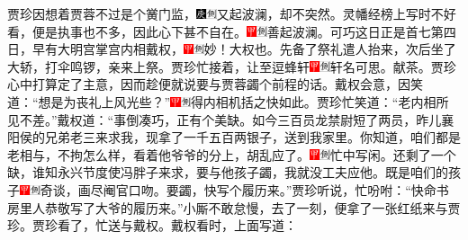 贾珍因想着贾蓉不过是个黉门监，{\includegraphics[width=3mm]{../Images/00004}\includegraphics[width=3mm]{../Images/00011}\footnotesize \kaishu 又起波澜，却不突然。}灵幡经榜上写时不好看，便是执事也不多，因此心下甚不自在。{\includegraphics[width=3mm]{../Images/00002}\includegraphics[width=3mm]{../Images/00011}\footnotesize \kaishu 善起波澜。}可巧这日正是首七第四日，早有大明宫掌宫内相戴权，{\includegraphics[width=3mm]{../Images/00002}\includegraphics[width=3mm]{../Images/00011}\footnotesize \kaishu 妙！大权也。}先备了祭礼遣人抬来，次后坐了大轿，打伞鸣锣，亲来上祭。贾珍忙接着，让至逗蜂轩{\includegraphics[width=3mm]{../Images/00002}\includegraphics[width=3mm]{../Images/00011}\footnotesize \kaishu 轩名可思。}献茶。贾珍心中打算定了主意，因而趁便就说要与贾蓉蠲个前程的话。戴权会意，因笑道：“想是为丧礼上风光些？”{\includegraphics[width=3mm]{../Images/00002}\includegraphics[width=3mm]{../Images/00011}\footnotesize \kaishu 得内相机括之快如此。}贾珍忙笑道：“老内相所见不差。”戴权道：“事倒凑巧，正有个美缺。如今三百员龙禁尉短了两员，昨儿襄阳侯的兄弟老三来求我，现拿了一千五百两银子，送到我家里。你知道，咱们都是老相与，不拘怎么样，看着他爷爷的分上，胡乱应了。{\includegraphics[width=3mm]{../Images/00002}\includegraphics[width=3mm]{../Images/00011}\footnotesize \kaishu 忙中写闲。}还剩了一个缺，谁知永兴节度使冯胖子来求，要与他孩子蠲，我就没工夫应他。既是咱们的孩子{\includegraphics[width=3mm]{../Images/00002}\includegraphics[width=3mm]{../Images/00011}\footnotesize \kaishu 奇谈，画尽阉官口吻。}要蠲，快写个履历来。”贾珍听说，忙吩咐：“快命书房里人恭敬写了大爷的履历来。”小厮不敢怠慢，去了一刻，便拿了一张红纸来与贾珍。贾珍看了，忙送与戴权。戴权看时，上面写道：

